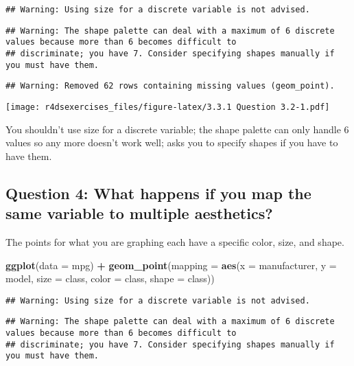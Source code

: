 \documentclass[
]{book}
\newenvironment{Shaded}{\begin{snugshade}}{\end{snugshade}}
\newcommand{\DataTypeTok}[1]{\textcolor[rgb]{0.13,0.29,0.53}{#1}}
\newcommand{\KeywordTok}[1]{\textcolor[rgb]{0.13,0.29,0.53}{\textbf{#1}}}
\newcommand{\NormalTok}[1]{#1}
\newcommand{\OperatorTok}[1]{\textcolor[rgb]{0.81,0.36,0.00}{\textbf{#1}}}
\newcommand{\StringTok}[1]{\textcolor[rgb]{0.31,0.60,0.02}{#1}}
\begin{document}
\begin{verbatim}
## Warning: Using size for a discrete variable is not advised.
\end{verbatim}

\begin{verbatim}
## Warning: The shape palette can deal with a maximum of 6 discrete values because more than 6 becomes difficult to
## discriminate; you have 7. Consider specifying shapes manually if you must have them.
\end{verbatim}

\begin{verbatim}
## Warning: Removed 62 rows containing missing values (geom_point).
\end{verbatim}

\texttt{[image: r4dsexercises\_files/figure-latex/3.3.1 Question 3.2-1.pdf]}

You shouldn't use size for a discrete variable; the shape palette can only handle 6 values so any more doesn't work well; asks you to specify shapes if you have to have them.

\hypertarget{question-4-what-happens-if-you-map-the-same-variable-to-multiple-aesthetics}{%
\subsection{Question 4: What happens if you map the same variable to multiple aesthetics?}\label{question-4-what-happens-if-you-map-the-same-variable-to-multiple-aesthetics}}

The points for what you are graphing each have a specific color, size, and shape.

\begin{Shaded}
\begin{Highlighting}[]
\KeywordTok{ggplot}\NormalTok{(}\DataTypeTok{data =}\NormalTok{ mpg) }\OperatorTok{+}
\StringTok{  }\KeywordTok{geom_point}\NormalTok{(}\DataTypeTok{mapping =} \KeywordTok{aes}\NormalTok{(}\DataTypeTok{x =}\NormalTok{ manufacturer, }\DataTypeTok{y =}\NormalTok{ model, }\DataTypeTok{size =}\NormalTok{ class, }\DataTypeTok{color =}\NormalTok{ class, }\DataTypeTok{shape =}\NormalTok{ class))}
\end{Highlighting}
\end{Shaded}

\begin{verbatim}
## Warning: Using size for a discrete variable is not advised.
\end{verbatim}

\begin{verbatim}
## Warning: The shape palette can deal with a maximum of 6 discrete values because more than 6 becomes difficult to
## discriminate; you have 7. Consider specifying shapes manually if you must have them.
\end{verbatim}
\end{document}
